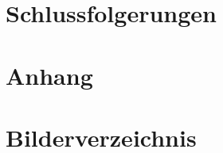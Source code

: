 \documentclass[12pt,a4paper]{article} %
\begin{document}
\newpage



\section{Schlussfolgerungen}
\newpage




\appendix
\section{Anhang}
\newpage





\section{Bilderverzeichnis}
\listoffigures



\newpage

\printbibliography
\end{document}
